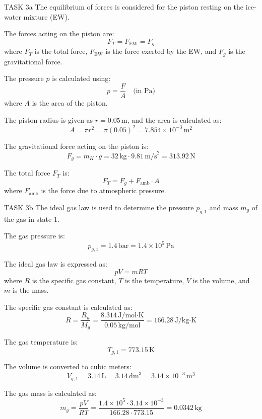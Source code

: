 TASK 3a  
The equilibrium of forces is considered for the piston resting on the ice-water mixture (EW).  

The forces acting on the piston are:  
\[
F_T = F_{\text{EW}} = F_g
\]  
where \( F_T \) is the total force, \( F_{\text{EW}} \) is the force exerted by the EW, and \( F_g \) is the gravitational force.  

The pressure \( p \) is calculated using:  
\[
p = \frac{F}{A} \quad \text{(in \(\text{Pa}\))}
\]  
where \( A \) is the area of the piston.  

The piston radius is given as \( r = 0.05 \, \text{m} \), and the area is calculated as:  
\[
A = \pi r^2 = \pi (0.05)^2 = 7.854 \times 10^{-3} \, \text{m}^2
\]  

The gravitational force acting on the piston is:  
\[
F_g = m_K \cdot g = 32 \, \text{kg} \cdot 9.81 \, \text{m/s}^2 = 313.92 \, \text{N}
\]  

The total force \( F_T \) is:  
\[
F_T = F_g + F_{\text{amb}} \cdot A
\]  
where \( F_{\text{amb}} \) is the force due to atmospheric pressure.  

TASK 3b  
The ideal gas law is used to determine the pressure \( p_{g,1} \) and mass \( m_g \) of the gas in state 1.  

The gas pressure is:  
\[
p_{g,1} = 1.4 \, \text{bar} = 1.4 \times 10^5 \, \text{Pa}
\]  

The ideal gas law is expressed as:  
\[
p V = m R T
\]  
where \( R \) is the specific gas constant, \( T \) is the temperature, \( V \) is the volume, and \( m \) is the mass.  

The specific gas constant is calculated as:  
\[
R = \frac{R_u}{M_g} = \frac{8.314 \, \text{J/mol·K}}{0.05 \, \text{kg/mol}} = 166.28 \, \text{J/kg·K}
\]  

The gas temperature is:  
\[
T_{g,1} = 773.15 \, \text{K}
\]  

The volume is converted to cubic meters:  
\[
V_{g,1} = 3.14 \, \text{L} = 3.14 \, \text{dm}^3 = 3.14 \times 10^{-3} \, \text{m}^3
\]  

The gas mass is calculated as:  
\[
m_g = \frac{p V}{R T} = \frac{1.4 \times 10^5 \cdot 3.14 \times 10^{-3}}{166.28 \cdot 773.15} = 0.0342 \, \text{kg}
\]